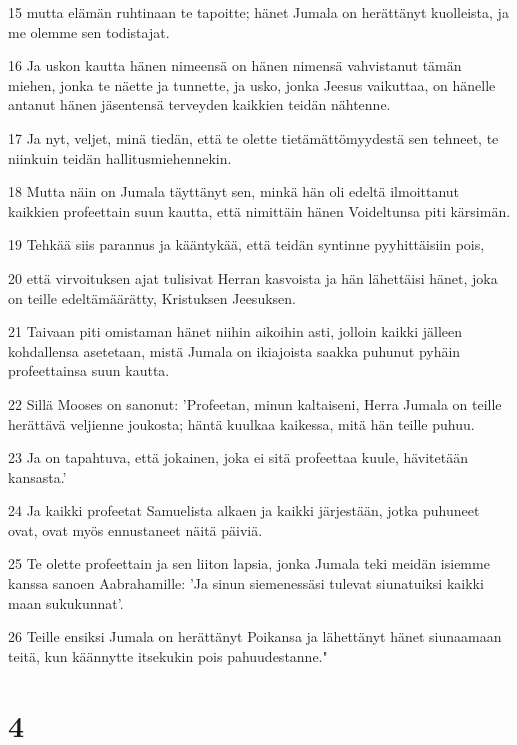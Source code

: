 \par 15 mutta elämän ruhtinaan te tapoitte; hänet Jumala on herättänyt kuolleista, ja me olemme sen todistajat.
\par 16 Ja uskon kautta hänen nimeensä on hänen nimensä vahvistanut tämän miehen, jonka te näette ja tunnette, ja usko, jonka Jeesus vaikuttaa, on hänelle antanut hänen jäsentensä terveyden kaikkien teidän nähtenne.
\par 17 Ja nyt, veljet, minä tiedän, että te olette tietämättömyydestä sen tehneet, te niinkuin teidän hallitusmiehennekin.
\par 18 Mutta näin on Jumala täyttänyt sen, minkä hän oli edeltä ilmoittanut kaikkien profeettain suun kautta, että nimittäin hänen Voideltunsa piti kärsimän.
\par 19 Tehkää siis parannus ja kääntykää, että teidän syntinne pyyhittäisiin pois,
\par 20 että virvoituksen ajat tulisivat Herran kasvoista ja hän lähettäisi hänet, joka on teille edeltämäärätty, Kristuksen Jeesuksen.
\par 21 Taivaan piti omistaman hänet niihin aikoihin asti, jolloin kaikki jälleen kohdallensa asetetaan, mistä Jumala on ikiajoista saakka puhunut pyhäin profeettainsa suun kautta.
\par 22 Sillä Mooses on sanonut: 'Profeetan, minun kaltaiseni, Herra Jumala on teille herättävä veljienne joukosta; häntä kuulkaa kaikessa, mitä hän teille puhuu.
\par 23 Ja on tapahtuva, että jokainen, joka ei sitä profeettaa kuule, hävitetään kansasta.'
\par 24 Ja kaikki profeetat Samuelista alkaen ja kaikki järjestään, jotka puhuneet ovat, ovat myös ennustaneet näitä päiviä.
\par 25 Te olette profeettain ja sen liiton lapsia, jonka Jumala teki meidän isiemme kanssa sanoen Aabrahamille: 'Ja sinun siemenessäsi tulevat siunatuiksi kaikki maan sukukunnat'.
\par 26 Teille ensiksi Jumala on herättänyt Poikansa ja lähettänyt hänet siunaamaan teitä, kun käännytte itsekukin pois pahuudestanne."

\chapter{4}

